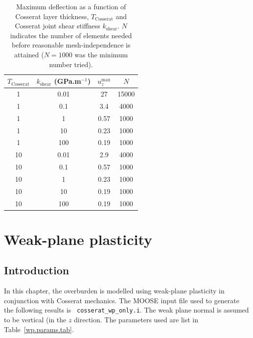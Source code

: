 \documentclass[]{scrreprt}
\begin{document}
\begin{table}[htb]
\begin{center}
\begin{tabular}{cccc}
  $T_{\mathrm{Cosserat}}$  & $k_{\mathrm{shear}}$ (GPa.m$^{-1}$) &
  $u_{z}^{\mathrm{max}}$ & $N$ \\
  \hline
  1 & 0.01 & 27 & 15000 \\
  1 & 0.1 & 3.4 & 4000 \\
  1 & 1 & 0.57 & 1000 \\
  1 & 10 & 0.23 & 1000 \\
  1 & 100 & 0.19 & 1000 \\
  10 & 0.01 & 2.9 & 4000 \\
  10 & 0.1 & 0.57 & 1000 \\
  10 & 1 & 0.23 & 1000 \\
  10 & 10 & 0.19 & 1000 \\
  10 & 100 & 0.19 & 1000 \\
\end{tabular}
\caption{Maximum deflection as a function of Cosserat layer thickness,
  $T_{\mathrm{Cosserat}}$ and Cosserat joint shear stiffness
  $k_{\mathrm{shear}}$.  $N$ indicates the number of elements needed
  before reasonable mesh-independence is attained ($N=1000$ was the
  minimum number tried).}
\label{elastic.deform.cosserat.shear}
\end{center}
\end{table}


\chapter{Weak-plane plasticity}
\label{wp.chap}

\section{Introduction}
In this chapter, the overburden is modelled using weak-plane
plasticity in conjunction with Cosserat mechanics.  The MOOSE input
file used to generate the following results is {\tt
  cosserat\_wp\_only.i}.  The weak plane
normal is assumed to be vertical (in the $z$ direction.  The parameters
used are list in Table~\ref{wp.params.tab}.
\end{document}
